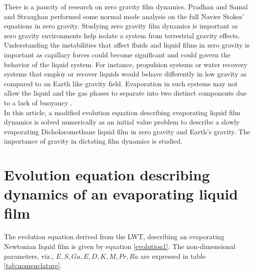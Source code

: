 \documentclass[a4paper,12pt]{article}
\begin{document}
There is a paucity of research on zero gravity film dynamics. Pradhan and Samal \citep{Pradhan1987a} and Straughan \citep{Straughan1989a} performed some normal mode analysis on the full Navier Stokes' equations in zero gravity.  Studying zero gravity film dynamics is important as zero gravity environments help isolate a system from terrestrial gravity effects. Understanding the instabilities that affect fluids and liquid films in zero gravity is important as capillary forces could become significant and could govern the behavior of the liquid system. For instance, propulsion systems or water recovery systems that employ or recover liquids would behave differently in low gravity as compared to an Earth like gravity field. Evaporation in such systems may not allow the liquid and the gas phases to separate into two distinct components due to a lack of buoyancy \citep{Ostrach1982a}.\\

In this article, a modified evolution equation describing evaporating liquid film dynamics is solved numerically as an initial value problem to describe a slowly evaporating Dicholoromethane liquid film in zero gravity and Earth's gravity. The importance of gravity in dictating film dynamics is studied. \\


\section{Evolution equation describing dynamics of an evaporating liquid film}

The evolution equation derived from the LWT, describing an evaporating Newtonian liquid film is given by equation \ref{evolution1}. The non-dimensional parameters, viz., $E, S, Ga, E, D, K, M, Pr, Ra$  are expressed in table \ref{tab:nomenclature}.
\end{document}
